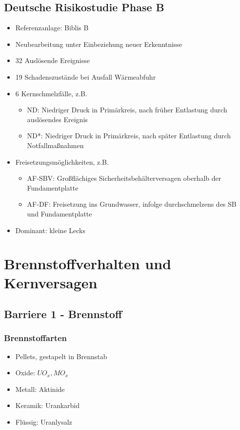 \documentclass[12pt]{article}
\begin{document}
\subsection{Deutsche Risikostudie Phase B}
\begin{itemize}
  \item Referenzanlage: Biblis B
  \item Neubearbeitung unter Einbeziehung neuer Erkenntnisse
  \item 32 Auslösende Ereignisse
  \item 19 Schadenszustände bei Ausfall Wärmeabfuhr
  \item 6 Kernschmelzfälle, z.B.
  \begin{itemize}
    \item ND: Niedriger Druck in Primärkreis, nach früher Entlastung durch auslösendes Ereignis
    \item ND*: Niedriger Druck in Primärkreis, nach später Entlastung durch Notfallmaßnahmen
  \end{itemize}
  \item Freisetzungsmöglichkeiten, z.B.
  \begin{itemize}
    \item AF-SBV: Großflächiges Sicherheitsbehälterversagen oberhalb der Fundamentplatte
    \item AF-DF: Freisetzung ins Grundwasser, infolge durchschmelzens des SB und Fundamentplatte
  \end{itemize}
  \item Dominant: kleine Lecks
\end{itemize}

\section{Brennstoffverhalten und Kernversagen}

\subsection{Barriere 1 - Brennstoff}

\subsubsection{Brennstoffarten}
\begin{itemize}
  \item Pellets, gestapelt in Brennstab
  \item Oxide: \(UO_x, MO_x\)
  \item Metall: Aktinide
  \item Keramik: Urankarbid
  \item Flüssig: Uranlysalz
\end{itemize}
\end{document}
